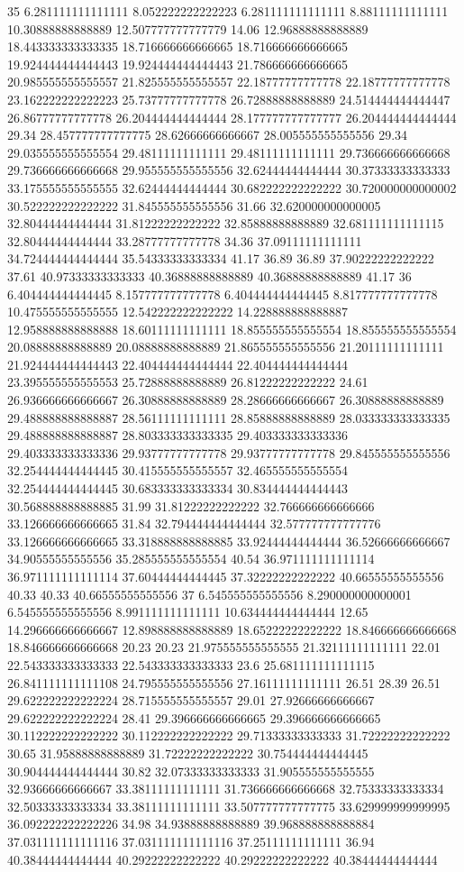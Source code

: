 35 6.281111111111111 8.052222222222223 6.281111111111111 8.88111111111111 10.30888888888889 12.507777777777779 14.06 12.96888888888889 18.443333333333335 18.716666666666665 18.716666666666665 19.924444444444443 19.924444444444443 21.786666666666665 20.985555555555557 21.825555555555557 22.18777777777778 22.18777777777778 23.162222222222223 25.73777777777778 26.72888888888889 24.514444444444447 26.86777777777778 26.204444444444444 28.177777777777777 26.204444444444444 29.34 28.457777777777775 28.62666666666667 28.005555555555556 29.34 29.035555555555554 29.48111111111111 29.48111111111111 29.736666666666668 29.736666666666668 29.955555555555556 32.62444444444444 30.37333333333333 33.175555555555555 32.62444444444444 30.682222222222222 30.720000000000002 30.522222222222222 31.845555555555556 31.66 32.620000000000005 32.80444444444444 31.81222222222222 32.85888888888889 32.681111111111115 32.80444444444444 33.28777777777778 34.36 37.09111111111111 34.724444444444444 35.54333333333334 41.17 36.89 36.89 37.90222222222222 37.61 40.97333333333333 40.36888888888889 40.36888888888889 41.17
36 6.404444444444445 8.157777777777778 6.404444444444445 8.817777777777778 10.475555555555555 12.542222222222222 14.228888888888887 12.958888888888888 18.60111111111111 18.855555555555554 18.855555555555554 20.08888888888889 20.08888888888889 21.865555555555556 21.20111111111111 21.924444444444443 22.404444444444444 22.404444444444444 23.395555555555553 25.72888888888889 26.81222222222222 24.61 26.936666666666667 26.30888888888889 28.28666666666667 26.30888888888889 29.488888888888887 28.56111111111111 28.85888888888889 28.033333333333335 29.488888888888887 28.803333333333335 29.403333333333336 29.403333333333336 29.93777777777778 29.93777777777778 29.845555555555556 32.254444444444445 30.415555555555557 32.465555555555554 32.254444444444445 30.683333333333334 30.834444444444443 30.568888888888885 31.99 31.81222222222222 32.766666666666666 33.126666666666665 31.84 32.794444444444444 32.577777777777776 33.126666666666665 33.318888888888885 33.92444444444444 36.52666666666667 34.90555555555556 35.285555555555554 40.54 36.971111111111114 36.971111111111114 37.60444444444445 37.32222222222222 40.66555555555556 40.33 40.33 40.66555555555556
37 6.545555555555556 8.290000000000001 6.545555555555556 8.991111111111111 10.634444444444444 12.65 14.296666666666667 12.898888888888889 18.65222222222222 18.846666666666668 18.846666666666668 20.23 20.23 21.975555555555555 21.32111111111111 22.01 22.543333333333333 22.543333333333333 23.6 25.681111111111115 26.841111111111108 24.795555555555556 27.16111111111111 26.51 28.39 26.51 29.622222222222224 28.715555555555557 29.01 27.92666666666667 29.622222222222224 28.41 29.396666666666665 29.396666666666665 30.112222222222222 30.112222222222222 29.71333333333333 31.72222222222222 30.65 31.95888888888889 31.72222222222222 30.754444444444445 30.904444444444444 30.82 32.07333333333333 31.905555555555555 32.93666666666667 33.38111111111111 31.736666666666668 32.75333333333334 32.50333333333334 33.38111111111111 33.507777777777775 33.629999999999995 36.092222222222226 34.98 34.93888888888889 39.968888888888884 37.031111111111116 37.031111111111116 37.25111111111111 36.94 40.38444444444444 40.29222222222222 40.29222222222222 40.38444444444444
